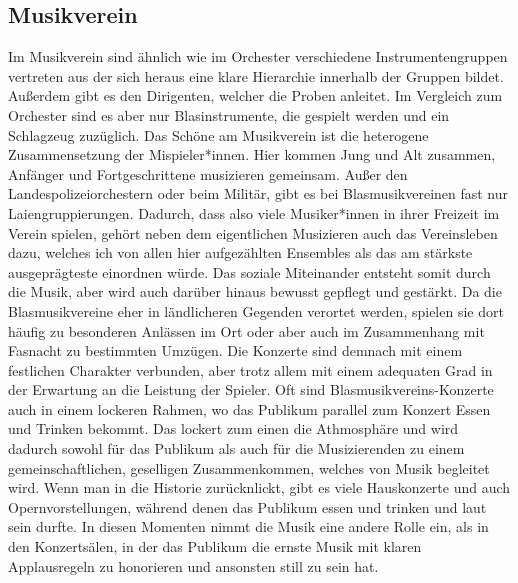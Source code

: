 \subsection{Musikverein}
Im Musikverein sind ähnlich wie im Orchester verschiedene
Instrumentengruppen vertreten aus der sich heraus eine klare Hierarchie
innerhalb der Gruppen bildet. Außerdem gibt es den Dirigenten, welcher die
Proben anleitet. Im Vergleich zum Orchester sind es aber nur Blasinstrumente, die
gespielt werden und ein Schlagzeug zuzüglich. Das Schöne am Musikverein ist die
heterogene Zusammensetzung der Mispieler*innen. Hier kommen Jung und Alt
zusammen, Anfänger und Fortgeschrittene musizieren gemeinsam. Außer den Landespolizeiorchestern oder
beim Militär, gibt es bei
Blasmusikvereinen fast nur Laiengruppierungen. Dadurch, dass also viele Musiker*innen in ihrer Freizeit im Verein
spielen, gehört neben dem eigentlichen Musizieren auch das Vereinsleben dazu,
welches ich von allen hier aufgezählten Ensembles als das am stärkste ausgeprägteste einordnen
würde. Das soziale Miteinander entsteht somit durch die Musik, aber wird auch
darüber hinaus bewusst gepflegt und gestärkt. Da die Blasmusikvereine eher in ländlicheren Gegenden verortet werden,
spielen sie dort häufig zu besonderen Anlässen im Ort oder aber auch im Zusammenhang
mit Fasnacht zu bestimmten Umzügen. Die Konzerte sind demnach mit einem festlichen
Charakter verbunden, aber trotz allem mit einem adequaten Grad in der Erwartung
an die Leistung der Spieler. Oft sind Blasmusikvereins-Konzerte auch in einem
lockeren Rahmen, wo das Publikum parallel zum Konzert Essen und Trinken bekommt.
Das lockert zum einen die Athmosphäre und wird dadurch sowohl für das Publikum
als auch für die Musizierenden zu einem gemeinschaftlichen, geselligen
Zusammenkommen, welches von Musik begleitet wird. Wenn man in die Historie
zurücknlickt, gibt es viele Hauskonzerte und auch Opernvorstellungen, während
denen das Publikum essen und trinken und laut sein durfte. In diesen Momenten
nimmt die Musik eine andere Rolle ein, als in den Konzertsälen, in der das
Publikum die ernste Musik mit klaren Applausregeln zu honorieren und ansonsten
still zu sein hat. 


